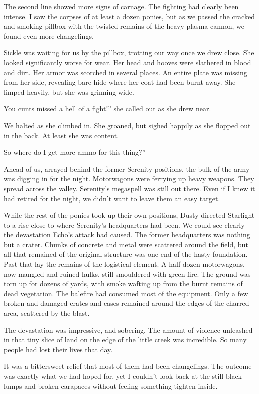The second line showed more signs of carnage. The fighting had clearly been intense. I saw the corpses of at least a dozen ponies, but as we passed the cracked and smoking pillbox with the twisted remains of the heavy plasma cannon, we found even more changelings.

Sickle was waiting for us by the pillbox, trotting our way once we drew close. She looked significantly worse for wear. Her head and hooves were slathered in blood and dirt. Her armor was scorched in several places. An entire plate was missing from her side, revealing bare hide where her coat had been burnt away. She limped heavily, but she was grinning wide.

\leavevmode{}You cunts missed a hell of a fight!” she called out as she drew near.

We halted as she climbed in. She groaned, but sighed happily as she flopped out in the back. At least she was content.

\leavevmode{}So where do I get more ammo for this thing?”

Ahead of us, arrayed behind the former Serenity positions, the bulk of the army was digging in for the night. Motorwagons were ferrying up heavy weapons. They spread across the valley. Serenity’s megaspell was still out there. Even if I knew it had retired for the night, we didn’t want to leave them an easy target.

While the rest of the ponies took up their own positions, Dusty directed Starlight to a rise close to where Serenity’s headquarters had been. We could see clearly the devastation Echo’s attack had caused. The former headquarters was nothing but a crater. Chunks of concrete and metal were scattered around the field, but all that remained of the original structure was one end of the hasty foundation. Past that lay the remains of the logistical element. A half dozen motorwagons, now mangled and ruined hulks, still smouldered with green fire. The ground was torn up for dozens of yards, with smoke wafting up from the burnt remains of dead vegetation. The balefire had consumed most of the equipment. Only a few broken and damaged crates and cases remained around the edges of the charred area, scattered by the blast.

The devastation was impressive, and sobering. The amount of violence unleashed in that tiny slice of land on the edge of the little creek was incredible. So many people had lost their lives that day.

It was a bittersweet relief that most of them had been changelings. The outcome was exactly what we had hoped for, yet I couldn’t look back at the still black lumps and broken carapaces without feeling something tighten inside.

